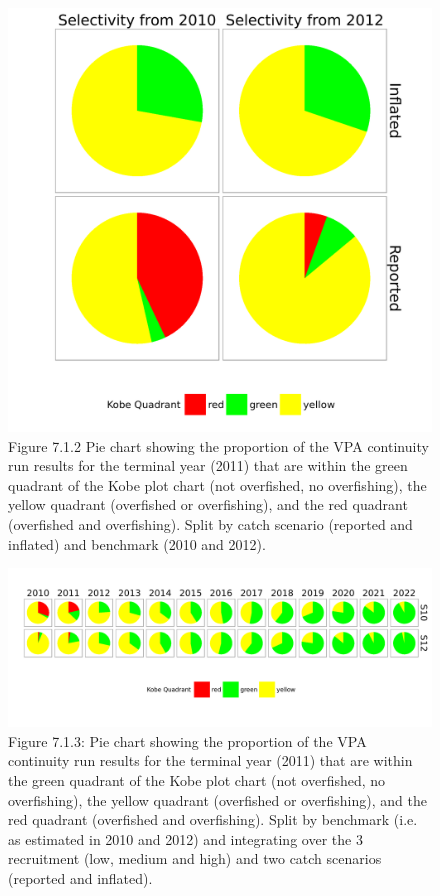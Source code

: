 \documentclass[a4paper, 10pt]{article}
\begin{document}
\begin{figure}[!ht]\begin{center}\includegraphics[width=6in]{7_1_2.png}\end{center}
\caption{Figure 7.1.2 Pie chart showing the proportion of the VPA continuity run results for the 
terminal year (2011) that are within the green quadrant of the Kobe plot chart (not overfished, no overfishing), 
the yellow quadrant (overfished or overfishing), and the red quadrant (overfished and overfishing). 
Split by catch scenario (reported and inflated) and benchmark (2010 and 2012).}
\label{fig:3}\end{figure}

\begin{figure}[!ht]\begin{center}\includegraphics[width=6in]{7_1_3.png}\end{center}
\caption{Figure 7.1.3: Pie chart showing the proportion of the VPA continuity run results for the terminal year (2011) 
that are within the green quadrant of the Kobe plot chart (not overfished, no overfishing), the yellow quadrant 
(overfished or overfishing), and the red quadrant (overfished and overfishing). Split by benchmark (i.e. as estimated in 2010 and 2012)
and integrating over the 3 recruitment (low, medium and high) and two catch scenarios (reported and inflated).}
\label{fig:4}\end{figure}
\end{document}
